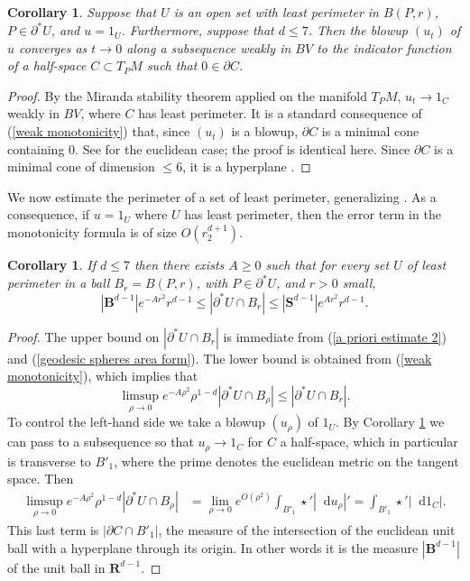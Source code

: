 \documentclass[reqno,11pt]{amsart}
\newcommand{\RR}{\mathbf{R}}
\newcommand{\Sph}{\mathbf S}
\newcommand{\Ball}{\mathbf{B}}
\newcommand*\dif{\mathop{}\!\mathrm{d}}
\newtheorem{corollary}[theorem]{Corollary}
\theoremstyle{definition}
\numberwithin{equation}{section}
\begin{document}
\begin{corollary}\label{blowup theorem}
Suppose that $U$ is an open set with least perimeter in $B(P, r)$, $P \in \partial^* U$, and $u = 1_U$.
Furthermore, suppose that $d \leq 7$.
Then the blowup $(u_t)$ of $u$ converges as $t \to 0$ along a subsequence weakly in $BV$ to the indicator function of a half-space $C \subset T_PM$ such that $0 \in \partial C$.
\end{corollary}
\begin{proof}
By the Miranda stability theorem applied on the manifold $T_PM$, $u_t \to 1_C$ weakly in $BV$, where $C$ has least perimeter.
It is a standard consequence of (\ref{weak monotonicity}) that, since $(u_t)$ is a blowup, $\partial C$ is a minimal cone containing $0$.
See \cite[Theorem 9.3]{Giusti77} for the euclidean case; the proof is identical here.
Since $\partial C$ is a minimal cone of dimension $\leq 6$, it is a hyperplane \cite[Theorem 9.10 and Theorem 10.10]{Giusti77}.
\end{proof}

We now estimate the perimeter of a set of least perimeter, generalizing \cite[Remark 5.13]{Giusti77}.
As a consequence, if $u = 1_U$ where $U$ has least perimeter, then the error term in the monotonicity formula is of size $O(r_2^{d + 1})$.

\begin{corollary}\label{doubling dimension}
If $d \leq 7$ then there exists $A \geq 0$ such that for every set $U$ of least perimeter in a ball $B_r = B(P, r)$, with $P \in \partial^* U$, and $r > 0$ small,
$$|\Ball^{d - 1}|e^{-Ar^2}r^{d - 1} \leq |\partial^*U \cap B_r| \leq |\Sph^{d - 1}|e^{Ar^2} r^{d - 1}.$$
\end{corollary}
\begin{proof}
The upper bound on $|\partial^* U \cap B_r|$ is immediate from (\ref{a priori estimate 2}) and (\ref{geodesic spheres area form}).
The lower bound is obtained from (\ref{weak monotonicity}), which implies that
$$\limsup_{\rho \to 0} e^{-A\rho^2} \rho^{1 - d} |\partial^* U \cap B_\rho| \leq |\partial^* U \cap B_r|.$$
To control the left-hand side we take a blowup $(u_\rho)$ of $1_U$.
By Corollary \ref{blowup theorem} we can pass to a subsequence so that $u_\rho \to 1_C$ for $C$ a half-space, which in particular is transverse to $B'_1$, where the prime denotes the euclidean metric on the tangent space.
Then
\begin{align*}
\limsup_{\rho \to 0} e^{-A\rho^2} \rho^{1 - d} |\partial^* U \cap B_\rho| &= \lim_{\rho \to 0} e^{O(\rho^2)} \int_{B'_1} \star'|\dif u_\rho|' = \int_{B'_1} \star'|\dif 1_C|.
\end{align*}
This last term is $|\partial C \cap B'_1|$, the measure of the intersection of the euclidean unit ball with a hyperplane through its origin.
In other words it is the measure $|\Ball^{d - 1}|$ of the unit ball in $\RR^{d - 1}$.
\end{proof}
\end{document}
